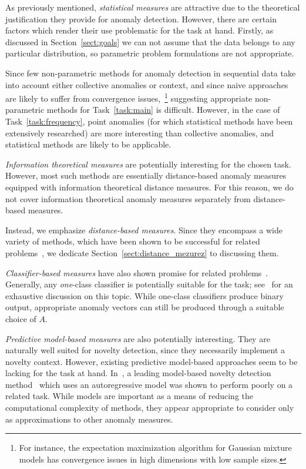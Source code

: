 As previously mentioned, \emph{statistical measures} are attractive due to the theoretical justification they provide for anomaly detection. However, there are certain factors which render their use problematic for the task at hand. Firstly, as discussed in Section~\ref{sect:goals} we can not assume that the data belongs to any particular distribution, so parametric problem formulations are not appropriate.

Since few non-parametric methods for anomaly detection in sequential data take into account either collective anomalies or context, and since naive approaches are likely to suffer from convergence issues,~\footnote{For instance, the expectation maximization algorithm for Gaussian mixture models has convergence issues in high dimensions with low sample sizes.} suggesting appropriate non-parametric methods for Task~\ref{task:main} is difficult. However, in the case of Task~\ref{task:frequency}, point anomalies (for which statistical methods have been extensively researched) are more interesting than collective anomalies, and statistical methods are likely to be applicable.

\emph{Information theoretical measures} are potentially interesting for the chosen task. However, most such methods are essentially distance-based anomaly measures equipped with information theoretical distance measures. For this reason, we do not cover information theoretical anomaly measures separately from distance-based measures.

Instead, we emphasize \emph{distance-based measures}. Since they encompass a wide variety of methods, which have been shown to be successful for related problems~\cite{chandola3}, we dedicate Section~\ref{sect:distance_mezurez} to discussing them.

\emph{Classifier-based measures} have also shown promise for related problems~\cite{chandola3}. Generally, any \emph{one}-class classifier is potentially suitable for the task; see~\cite{classification} for an exhaustive discussion on this topic. While one-class classifiers produce binary output, appropriate anomaly vectors can still be produced through a suitable choice of $A$.

\emph{Predictive model-based measures} are also potentially interesting. They are naturally well suited for novelty detection, since they necessarily implement a novelty context. However, existing predictive model-based approaches seem to be lacking for the task at hand. In~\cite{chandola3}, a leading model-based novelty detection method~\cite{perkins2} which uses an autoregressive model was shown to perform poorly on a related task. While models are important as a means of reducing the computational complexity of methods, they appear appropriate to consider only as approximations to other anomaly measures.

